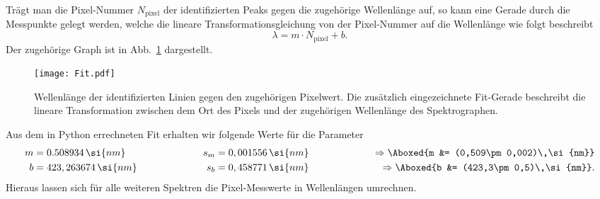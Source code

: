 Trägt man die Pixel-Nummer $N_{\text{pixel}}$ der identifizierten Peaks 
gegen die zugehörige Wellenlänge auf, so kann eine Gerade durch die Messpunkte gelegt 
werden, welche die lineare Transformationsgleichung von der Pixel-Nummer auf 
die Wellenlänge wie folgt beschreibt
\begin{equation}
    \lambda = m\cdot N_{\text{pixel}} + b. 
\end{equation} \newpage
Der zugehörige Graph ist in Abb.~\ref{fig:fit} dargestellt.
\begin{figure}[h!]
    \centering
    \texttt{[image: Fit.pdf]}
    \caption{\label{fig:fit}Wellenlänge der identifizierten Linien gegen den zugehörigen 
    Pixelwert. Die zusätzlich eingezeichnete Fit-Gerade beschreibt die lineare Transformation 
    zwischen dem Ort des Pixels und der zugehörigen Wellenlänge des Spektrographen.}
\end{figure}\FloatBarrier
Aus dem in Python errechneten Fit erhalten wir folgende Werte für die Parameter
\begin{alignat}{3}
    m &= 0.508934\,\si{nm}\hspace{2cm}& s_{m} &= 0,001556\,\si{nm}\hspace{2cm} &\Rightarrow \Aboxed{m &= (0,509\pm 0,002)\,\si{nm}} \label{eq:kali}\\
    b &= 423,263674\,\si{nm}\hspace{2cm}& s_{b} &= 0,458771\,\si{nm}\hspace{2cm} &\Rightarrow \Aboxed{b &= (423,3\pm 0,5)\,\si{nm}}.
\end{alignat}
Hieraus lassen sich für alle weiteren Spektren die Pixel-Messwerte in Wellenlängen umrechnen. \\


